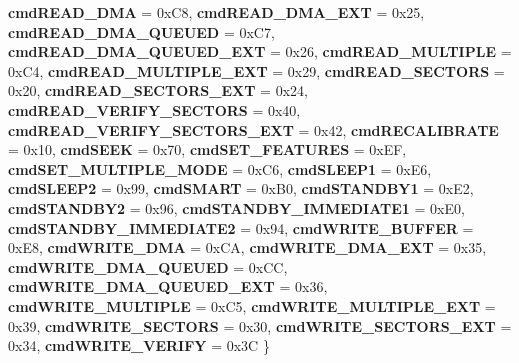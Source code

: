 \begin{DoxyCompactItemize}
\newline
{\bfseries cmd\+R\+E\+A\+D\+\_\+\+D\+MA} = 0x\+C8, 
{\bfseries cmd\+R\+E\+A\+D\+\_\+\+D\+M\+A\+\_\+\+E\+XT} = 0x25, 
{\bfseries cmd\+R\+E\+A\+D\+\_\+\+D\+M\+A\+\_\+\+Q\+U\+E\+U\+ED} = 0x\+C7, 
{\bfseries cmd\+R\+E\+A\+D\+\_\+\+D\+M\+A\+\_\+\+Q\+U\+E\+U\+E\+D\+\_\+\+E\+XT} = 0x26, 
\newline
{\bfseries cmd\+R\+E\+A\+D\+\_\+\+M\+U\+L\+T\+I\+P\+LE} = 0x\+C4, 
{\bfseries cmd\+R\+E\+A\+D\+\_\+\+M\+U\+L\+T\+I\+P\+L\+E\+\_\+\+E\+XT} = 0x29, 
{\bfseries cmd\+R\+E\+A\+D\+\_\+\+S\+E\+C\+T\+O\+RS} = 0x20, 
{\bfseries cmd\+R\+E\+A\+D\+\_\+\+S\+E\+C\+T\+O\+R\+S\+\_\+\+E\+XT} = 0x24, 
\newline
{\bfseries cmd\+R\+E\+A\+D\+\_\+\+V\+E\+R\+I\+F\+Y\+\_\+\+S\+E\+C\+T\+O\+RS} = 0x40, 
{\bfseries cmd\+R\+E\+A\+D\+\_\+\+V\+E\+R\+I\+F\+Y\+\_\+\+S\+E\+C\+T\+O\+R\+S\+\_\+\+E\+XT} = 0x42, 
{\bfseries cmd\+R\+E\+C\+A\+L\+I\+B\+R\+A\+TE} = 0x10, 
{\bfseries cmd\+S\+E\+EK} = 0x70, 
\newline
{\bfseries cmd\+S\+E\+T\+\_\+\+F\+E\+A\+T\+U\+R\+ES} = 0x\+EF, 
{\bfseries cmd\+S\+E\+T\+\_\+\+M\+U\+L\+T\+I\+P\+L\+E\+\_\+\+M\+O\+DE} = 0x\+C6, 
{\bfseries cmd\+S\+L\+E\+E\+P1} = 0x\+E6, 
{\bfseries cmd\+S\+L\+E\+E\+P2} = 0x99, 
\newline
{\bfseries cmd\+S\+M\+A\+RT} = 0x\+B0, 
{\bfseries cmd\+S\+T\+A\+N\+D\+B\+Y1} = 0x\+E2, 
{\bfseries cmd\+S\+T\+A\+N\+D\+B\+Y2} = 0x96, 
{\bfseries cmd\+S\+T\+A\+N\+D\+B\+Y\+\_\+\+I\+M\+M\+E\+D\+I\+A\+T\+E1} = 0x\+E0, 
\newline
{\bfseries cmd\+S\+T\+A\+N\+D\+B\+Y\+\_\+\+I\+M\+M\+E\+D\+I\+A\+T\+E2} = 0x94, 
{\bfseries cmd\+W\+R\+I\+T\+E\+\_\+\+B\+U\+F\+F\+ER} = 0x\+E8, 
{\bfseries cmd\+W\+R\+I\+T\+E\+\_\+\+D\+MA} = 0x\+CA, 
{\bfseries cmd\+W\+R\+I\+T\+E\+\_\+\+D\+M\+A\+\_\+\+E\+XT} = 0x35, 
\newline
{\bfseries cmd\+W\+R\+I\+T\+E\+\_\+\+D\+M\+A\+\_\+\+Q\+U\+E\+U\+ED} = 0x\+CC, 
{\bfseries cmd\+W\+R\+I\+T\+E\+\_\+\+D\+M\+A\+\_\+\+Q\+U\+E\+U\+E\+D\+\_\+\+E\+XT} = 0x36, 
{\bfseries cmd\+W\+R\+I\+T\+E\+\_\+\+M\+U\+L\+T\+I\+P\+LE} = 0x\+C5, 
{\bfseries cmd\+W\+R\+I\+T\+E\+\_\+\+M\+U\+L\+T\+I\+P\+L\+E\+\_\+\+E\+XT} = 0x39, 
\newline
{\bfseries cmd\+W\+R\+I\+T\+E\+\_\+\+S\+E\+C\+T\+O\+RS} = 0x30, 
{\bfseries cmd\+W\+R\+I\+T\+E\+\_\+\+S\+E\+C\+T\+O\+R\+S\+\_\+\+E\+XT} = 0x34, 
{\bfseries cmd\+W\+R\+I\+T\+E\+\_\+\+V\+E\+R\+I\+FY} = 0x3C
 \}
\item 
\mbox{\label{class_a_t_a_driver_a2abcb2093e0beb44ed5b5f71611e57aa}} 

\end{DoxyCompactItemize}

